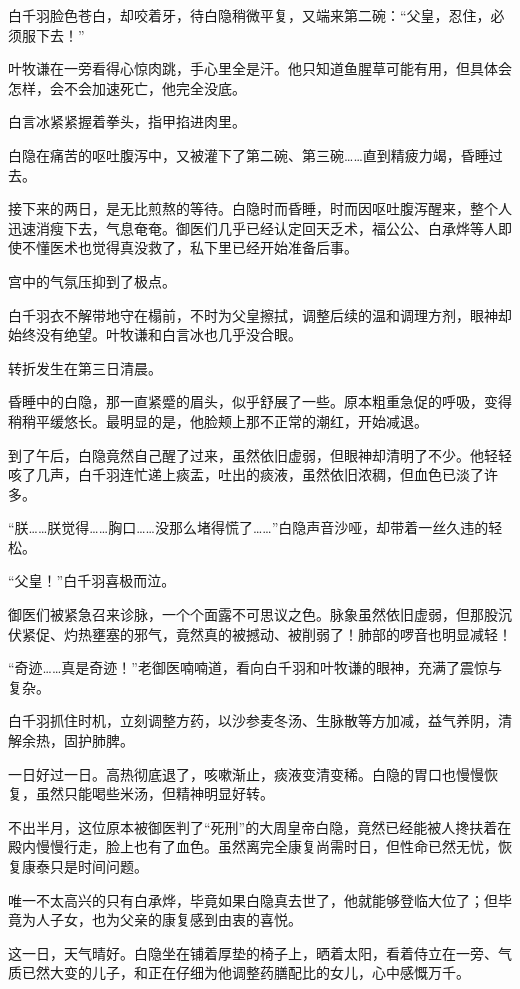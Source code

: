 白千羽脸色苍白，却咬着牙，待白隐稍微平复，又端来第二碗：“父皇，忍住，必须服下去！”

叶牧谦在一旁看得心惊肉跳，手心里全是汗。他只知道鱼腥草可能有用，但具体会怎样，会不会加速死亡，他完全没底。

白言冰紧紧握着拳头，指甲掐进肉里。

白隐在痛苦的呕吐腹泻中，又被灌下了第二碗、第三碗……直到精疲力竭，昏睡过去。

接下来的两日，是无比煎熬的等待。白隐时而昏睡，时而因呕吐腹泻醒来，整个人迅速消瘦下去，气息奄奄。御医们几乎已经认定回天乏术，福公公、白承烨等人即使不懂医术也觉得真没救了，私下里已经开始准备后事。

宫中的气氛压抑到了极点。

白千羽衣不解带地守在榻前，不时为父皇擦拭，调整后续的温和调理方剂，眼神却始终没有绝望。叶牧谦和白言冰也几乎没合眼。

转折发生在第三日清晨。

昏睡中的白隐，那一直紧蹙的眉头，似乎舒展了一些。原本粗重急促的呼吸，变得稍稍平缓悠长。最明显的是，他脸颊上那不正常的潮红，开始减退。

到了午后，白隐竟然自己醒了过来，虽然依旧虚弱，但眼神却清明了不少。他轻轻咳了几声，白千羽连忙递上痰盂，吐出的痰液，虽然依旧浓稠，但血色已淡了许多。

“朕……朕觉得……胸口……没那么堵得慌了……”白隐声音沙哑，却带着一丝久违的轻松。

“父皇！”白千羽喜极而泣。

御医们被紧急召来诊脉，一个个面露不可思议之色。脉象虽然依旧虚弱，但那股沉伏紧促、灼热壅塞的邪气，竟然真的被撼动、被削弱了！肺部的啰音也明显减轻！

“奇迹……真是奇迹！”老御医喃喃道，看向白千羽和叶牧谦的眼神，充满了震惊与复杂。

白千羽抓住时机，立刻调整方药，以沙参麦冬汤、生脉散等方加减，益气养阴，清解余热，固护肺脾。

一日好过一日。高热彻底退了，咳嗽渐止，痰液变清变稀。白隐的胃口也慢慢恢复，虽然只能喝些米汤，但精神明显好转。

不出半月，这位原本被御医判了“死刑”的大周皇帝白隐，竟然已经能被人搀扶着在殿内慢慢行走，脸上也有了血色。虽然离完全康复尚需时日，但性命已然无忧，恢复康泰只是时间问题。

唯一不太高兴的只有白承烨，毕竟如果白隐真去世了，他就能够登临大位了；但毕竟为人子女，也为父亲的康复感到由衷的喜悦。

这一日，天气晴好。白隐坐在铺着厚垫的椅子上，晒着太阳，看着侍立在一旁、气质已然大变的儿子，和正在仔细为他调整药膳配比的女儿，心中感慨万千。

